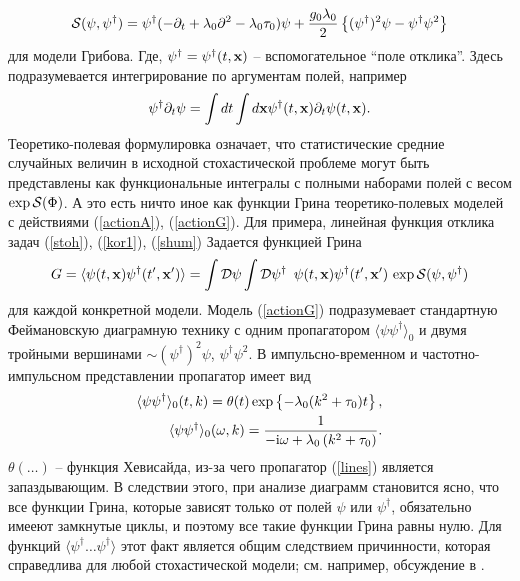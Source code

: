 \documentclass[a4paper,10pt]{article}
\def\S{{\cal S}}
\def\S{{\cal S}}
\begin{document}
\begin{eqnarray}
\S(\psi,\psi^{\dag}) =  \psi^{\dag}
(-\partial_{t}+\lambda_{0} \partial^{2}- \lambda_{0}\tau_{0}) \psi
+ \frac{g_{0}\lambda_{0}}{2} \left\{ (\psi^{\dagger})^2\psi -
\psi^{\dagger}\psi^2  \right\}
\label{actionG}
\end{eqnarray}
для модели Грибова.
Где, $\psi^{\dag}=\psi^{\dag}(t,{\bf x})$ -- вспомогательное ``поле отклика''.
Здесь подразумевается интегрирование по аргументам полей,
например
\[  \psi^{\dag}\partial_{t}\psi = \int dt \int d{\bf x}
\psi^{\dag}(t,{\bf x})\partial_{t}\psi(t,{\bf x}). \]
Теоретико-полевая формулировка означает, что статистические средние случайных величин в исходной стохастической проблеме могут
быть представлены как функциональные интегралы с полными наборами полей с весом $\exp {\cal S}(\Phi)$. А это есть ничто иное как
 функции Грина теоретико-полевых моделей с действиями (\ref{actionA}), (\ref{actionG}). 
Для примера, линейная функция отклика задач (\ref{stoh}), (\ref{kor1}), (\ref{shum})  Задается функцией Грина 
\begin{eqnarray}
G=\langle \psi(t, {\bf x}) \psi^{\dag}(t', {\bf x'} ) \rangle =
\int {\cal D}\psi \int {\cal D} \psi^{\dag}\ \,
\psi(t, {\bf x}) \psi^{\dag}(t', {\bf x'})\, \exp {\cal S}(\psi,\psi^{\dag})
\label{respd}
\end{eqnarray}
для каждой конкретной модели.
Модель (\ref{actionG}) подразумевает стандартную Феймановскую диаграмную технику с одним пропагатором
$\langle \psi \psi^{\dag} \rangle_{0}$ и двумя тройными вершинами
$\sim (\psi^{\dagger})^2\psi$, $\psi^{\dagger}\psi^2$.
В импульсно-временном и частотно-импульсном представлении пропагатор имеет вид
\begin{eqnarray}
\langle \psi \psi^{\dag} \rangle_{0}(t,k) =
\theta(t) \exp \left\{ - \lambda_{0}
(k^{2}+\tau_{0}) t \right\}, \nonumber \\
\langle \psi \psi^{\dag} \rangle_{0} (\omega,k) =
\frac{1}{-{\rm i}\omega+\lambda_{0} \left(k^{2}+\tau_{0}\right)}.
\label{lines}
\end{eqnarray}
$\theta(\dots)$ -- функция Хевисайда, из-за чего пропагатор
(\ref{lines}) является запаздывающим.
В следствии этого, при анализе диаграмм становится ясно, что все функции Грина, которые зависят только от полей $\psi$ или $\psi^{\dag}$,
  обязательно имееют замкнутые циклы, и поэтому все такие функции Грина равны нулю.
Для функций $\langle \psi^{\dag} \dots \psi^{\dag} \rangle$
этот факт является общим следствием причинности, которая справедлива для любой стохастической модели; см. например, обсуждение в \cite{Book3}.
\end{document}
